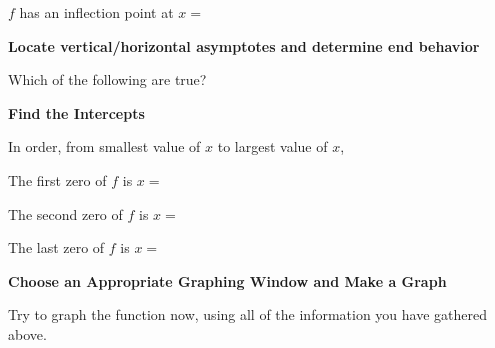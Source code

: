 \documentclass{ximera}
\begin{document}
	\begin{question}
		$f$ has an inflection point at $x=$
	\end{question} 
 
 \textbf{Locate vertical/horizontal asymptotes and determine end behavior}
 
 \begin{question}
 Which of the following are true?
 
 \begin{multipleChoice}
    \end{multipleChoice}
    \end{question}
    
  \textbf{Find the Intercepts}
  
 In order, from smallest value of $x$ to largest value of $x$, 
 
 \begin{question}
 	The first zero of $f$ is $x=$ 
 \end{question}
 
  \begin{question}
 	The second zero of $f$ is $x=$ 
 \end{question}
 
  \begin{question}
 	The last zero of $f$ is $x=$ 
 \end{question}
 
  \textbf{Choose an Appropriate Graphing Window and Make a Graph}
  
  Try to graph the function now, using all of the information you have gathered above.    
  
\end{document}
